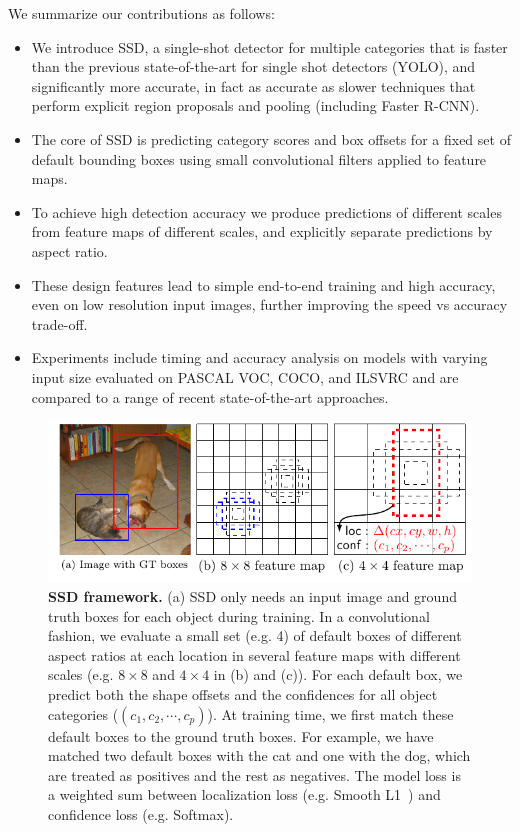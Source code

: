 \documentclass[runningheads]{llncs}
\begin{document}
We summarize our contributions as follows:
\begin{itemize}
\item We introduce SSD, a single-shot detector for multiple categories that is faster than the previous state-of-the-art for single shot detectors (YOLO), and significantly more accurate, in fact as accurate as slower techniques that perform explicit region proposals and pooling (including Faster R-CNN).

\item The core of SSD is predicting category scores and box offsets for a fixed set of default bounding boxes using small convolutional filters applied to feature maps.

\item To achieve high detection accuracy we produce predictions of different scales from feature maps of different scales, and explicitly separate predictions by aspect ratio.

\item These design features lead to simple end-to-end training and high accuracy, even on low resolution input images, further improving the speed vs accuracy trade-off.

\item Experiments include timing and accuracy analysis on models with varying input size evaluated on PASCAL VOC, COCO, and ILSVRC and are compared to a range of recent state-of-the-art approaches.
\end{itemize}

\begin{figure}[tbp]
    \centering
    \includegraphics[width=0.9\linewidth]{figure/ssd.pdf}
    \caption{\textbf{SSD framework.} (a) SSD only needs an input image and ground truth boxes for each object during training. In a convolutional fashion, we evaluate a small set (e.g. 4) of default boxes of different aspect ratios at each location in several feature maps with different scales (e.g. $8\times 8$ and $4\times 4$ in (b) and (c)). For each default box, we predict both the shape offsets and the confidences for all object categories ($(c_1, c_2, \cdots, c_p)$). At training time, we first match these default boxes to the ground truth boxes. For example, we have matched two default boxes with the cat and one with the dog, which are treated as positives and the rest as negatives. The model loss is a weighted sum between localization loss (e.g. Smooth L1~\cite{girshick2015fast}) and confidence loss (e.g. Softmax).}
    \label{fig:ssdframework}
\end{figure}
\end{document}

